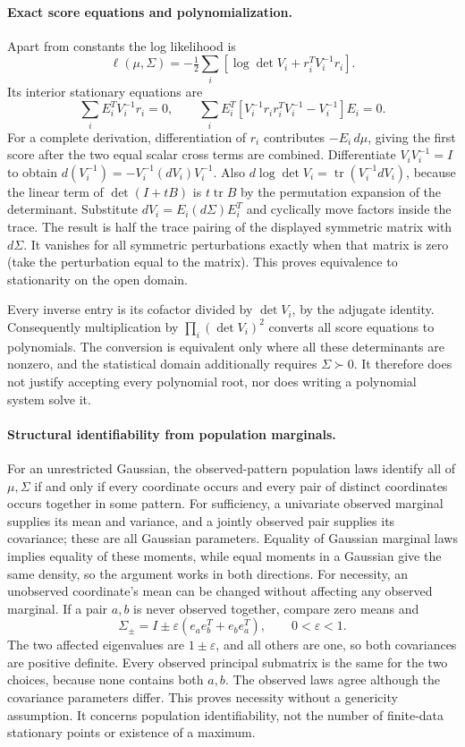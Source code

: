 \documentclass[11pt]{article}
\begin{document}
\paragraph{Exact score equations and polynomialization.}
Apart from constants the log likelihood is
\[
\ell(\mu,\Sigma)=-\tfrac12\sum_i
 [\log\det V_i+r_i^TV_i^{-1}r_i].
\]
Its interior stationary equations are
\[
\sum_iE_i^TV_i^{-1}r_i=0,
\qquad
\sum_i E_i^T[V_i^{-1}r_ir_i^TV_i^{-1}-V_i^{-1}]E_i=0.
\]
For a complete derivation, differentiation of $r_i$ contributes
$-E_i\,d\mu$, giving the first score after the two equal scalar
cross terms are combined. Differentiate
$V_i V_i^{-1}=I$ to obtain
$d(V_i^{-1})=-V_i^{-1}(dV_i)V_i^{-1}$.
Also $d\log\det V_i=\operatorname{tr}(V_i^{-1}dV_i)$, because the
linear term of $\det(I+tB)$ is $t\operatorname{tr}B$ by the
permutation expansion of the determinant. Substitute
$dV_i=E_i(d\Sigma)E_i^T$ and cyclically move factors inside the
trace. The result is half the trace pairing of the displayed symmetric
matrix with $d\Sigma$. It vanishes for all symmetric perturbations
exactly when that matrix is zero (take the perturbation equal to the
matrix). This proves equivalence to stationarity on the open domain.

Every inverse entry is its cofactor divided by $\det V_i$, by the
adjugate identity. Consequently multiplication by
$\prod_i(\det V_i)^2$ converts all score equations to polynomials.
The conversion is equivalent only where all these determinants are
nonzero, and the statistical domain additionally requires
$\Sigma\succ0$. It therefore does not justify accepting every
polynomial root, nor does writing a polynomial system solve it.

\paragraph{Structural identifiability from population marginals.}
For an unrestricted Gaussian, the observed-pattern population laws
identify all of $\mu,\Sigma$ if and only if every coordinate occurs
and every pair of distinct coordinates occurs together in some pattern.
For sufficiency, a univariate observed marginal supplies its mean and
variance, and a jointly observed pair supplies its covariance; these
are all Gaussian parameters. Equality of Gaussian marginal laws implies
equality of these moments, while equal moments in a Gaussian give
the same density, so the argument works in both directions.
For necessity, an unobserved coordinate's mean can be changed without
affecting any observed marginal. If a pair $a,b$ is never observed
together, compare zero means and
\[
\Sigma_\pm=I\pm\varepsilon(e_ae_b^T+e_be_a^T),\qquad
0<\varepsilon<1.
\]
The two affected eigenvalues are $1\pm\varepsilon$, and all others
are one, so both covariances are positive definite. Every observed
principal submatrix is the same for the two choices, because none
contains both $a,b$. The observed laws agree although the covariance
parameters differ. This proves necessity without a genericity assumption.
It concerns population identifiability, not the number of finite-data
stationary points or existence of a maximum.
\end{document}
